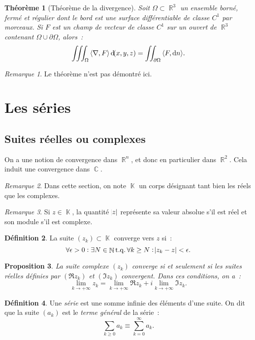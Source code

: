 \documentclass{article}
\DeclareMathOperator{\C}{\mathbb C}
\DeclareMathOperator{\K}{\mathbb K}
\DeclareMathOperator{\R}{\mathbb R}
\DeclareMathOperator{\N}{\mathbb N}
\DeclareMathOperator{\tq}{ t.q. }
\newcommand{\scpr}[2]{{\left\langle#1, #2\right\rangle}}
\newcommand{\divg}[1]{\scpr \nabla {#1}}
\newtheorem{thm}{Théorème}[section]
\newtheorem{prp}[thm]{Proposition}
\theoremstyle{definition}
\newtheorem{déf}[thm]{Définition}
\theoremstyle{remark}
\newtheorem*{rmq}{Remarque}
\begin{document}
		\begin{thm}[Théorème de la divergence]\label{thm:divergence} Soit $\Omega \subset \R^3$ un ensemble borné, fermé et régulier dont le bord est une surface
		différentiable de classe $C^1$ par morceaux. Si $F$ est un champ de vecteur de classe $C^1$ sur un ouvert de $\R^3$ contenant $\Omega \cup \partial \Omega$,
		alors~:
		\[\iiint_\Omega\divg F\dif (x, y, z) = \iint_{\partial \Omega}\scpr F{\dif n}.\]
		\end{thm}

		\begin{rmq} Le théorème n'est pas démontré ici. \end{rmq}

\newpage
\section{Les séries}\label{sec:séries}
	\subsection{Suites réelles ou complexes}
		On a une notion de convergence dans $\R^n$, et donc en particulier dans $\R^2$. Cela induit une convergence dans $\C$.

		\begin{rmq} Dans cette section, on note $\K$ un corps désignant tant bien les réels que les complexes. \end{rmq}

		\begin{rmq} Si $z \in \K$, la quantité $\abs z$ représente sa valeur absolue s'il est réel et son module s'il est complexe. \end{rmq}

		\begin{déf} La suite $(z_k) \subset \K$ converge vers $z$ si~:
		\[\forall \epsilon > 0 : \exists N \in \N \tq \forall k \geq N : \abs {z_k-z} < \epsilon.\]
		\end{déf}

		\begin{prp} La suite complexe $(z_k)$ converge si et seulement si les suites réelles définies par $(\Re z_k)$ et $(\Im z_k)$ convergent.
		Dans ces conditions, on a~:
		\[\lim_{k \to +\infty}z_k = \lim_{k \to +\infty}\Re z_k + i\lim_{k \to +\infty}\Im z_k.\]
		\end{prp}

		\begin{déf} Une \emph{série} est une somme infinie des éléments d'une suite. On dit que la suite $(a_k)$ est le \emph{terme général} de la série~:
		\[\sum_{k \geq 0}a_k \equiv \sum_{k=0}^\infty a_k.\]
		\end{déf}
\end{document}
